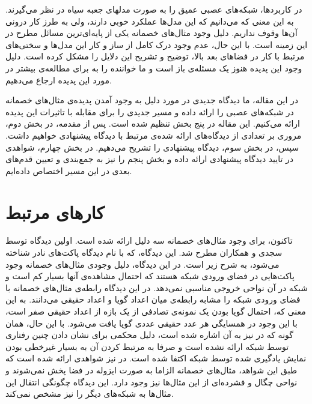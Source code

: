 \documentclass[12pt,onecolumn,a4paper]{article}
\begin{document}
در کاربردها، شبکه‌های عصبی عمیق را به صورت مدلهای جعبه سیاه در نظر می‌گیرند. به این معنی که می‌دانیم که این مدل‌ها عملکرد خوبی دارند، ولی به طرز کار درونی آن‌ها وقوف نداریم. دلیل وجود مثال‌های خصمانه یکی از پایه‌ای‌ترین مسائل  مطرح در این زمینه است. با این حال، عدم وجود درک کامل از ساز و کار این مدل‌ها و سختی‌های مرتبط با کار در فضاهای بعد بالا، توضیح و تشریح این دلایل را مشکل کرده است. دلیل وجود این پدیده هنوز یک مسئله‌ی باز است و ما خواننده را به \cite{Yuan_2019} برای مطالعه‌ی بیشتر در مورد این پدیده ارجاع می‌دهیم.

در این مقاله، ما دیدگاه جدیدی در مورد دلیل به وجود آمدن پدیده‌ی مثال‌های خصمانه در شبکه‌های عصبی را ارائه داده و مسیر جدیدی را برای مقابله با تاثیرات این پدیده ارائه می‌کنیم. این مقاله در پنج بخش تنظیم شده است. پس از مقدمه، در بخش دوم، مروری بر تعدادی از دیدگاه‌های ارائه شده‌ی مرتبط با دیدگاه پیشنهادی خواهیم داشت. سپس، در بخش سوم، دیدگاه پیشنهادی را تشریح می‌دهیم. در بخش چهارم، شواهدی  در تایید دیدگاه پیشنهادی ارائه داده و بخش پنجم را نیز به جمع‌بندی و تعیین قدم‌های بعدی در این مسیر اختصاص داده‌ایم.

\section{کارهای مرتبط}
تاکنون، برای وجود مثال‌های خصمانه سه دلیل ارائه شده است. اولین دیدگاه توسط سجدی و همکاران\cite{szegedy2013intriguing}
مطرح شد. این دیدگاه، که با نام دیدگاه پاکت‌های نادر شناخته می‌شود، به شرح زیر است. در این دیدگاه، دلیل وجودی مثال‌های خصمانه وجود پاکت‌هایی در فضای ورودی شبکه هستند که احتمال مشاهده‌ی آنها بسیار کم است و شبکه در آن نواحی خروجی مناسبی نمی‌دهد. در این دیدگاه رابطه‌ی مثال‌های خصمانه با فضای ورودی شبکه را مشابه رابطه‌ی میان اعداد گویا و اعداد حقیقی می‌دانند. به این معنی که، احتمال گویا بودن یک نمونه‌ی تصادفی از یک بازه از اعداد حقیقی صفر است، با این وجود در همسایگی هر عدد حقیقی عددی گویا یافت می‌شود. با این حال،
همان گونه که در
\cite{tanay2016boundary}
نیز به آن اشاره شده است، دلیل محکمی برای نشان دادن چنین رفتاری توسط شبکه ارائه نشده است و صرفا به مرتبط کردن آن به بسیار غیرخطی بودن نمایش یادگیری شده توسط شبکه اکتفا شده است. در 
\cite{Tabacof_2016}
 نیز شواهدی ارائه شده است که طبق این شواهد، مثال‌های خصمانه الزاما به صورت ایزوله در فضا پخش نمی‌شوند و نواحی چگال و فشرده‌ای از این مثال‌ها نیز وجود دارد. این دیدگاه چگونگی انتقال این مثال‌ها به شبکه‌های دیگر را نیز مشخص نمی‌کند.
\end{document}
